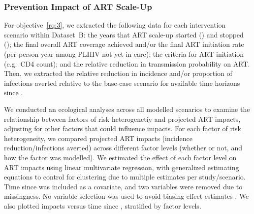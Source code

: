 \subsubsection{Prevention Impact of ART Scale-Up}
\label{sss:meth:api}
For objective~\ref{rq:3}, we extracted
the following data for each intervention scenario within Dataset~B:
the years that ART scale-up started () and stopped ();
the final overall ART coverage achieved and/or
the final ART initiation rate (per person-year among PLHIV not yet in care);
the criteria for ART initiation (e.g.\ CD4 count); and
the relative reduction in transmission probability on ART.
Then, we extracted the
relative reduction in incidence and/or proportion of infections averted
relative to the base-case scenario for available time horizons since .
\par
We conducted an ecological analyses across all modelled scenarios to examine the relationship between
factors of risk heterogenetiy and projected ART impacts,
adjusting for other factors that could influence impacts.
For each factor of risk heterogeneity, we compared
projected ART impacts (incidence reduction/infections averted)
across different factor levels (whether or not, and how the factor was modelled).
We estimated the effect of each factor level on ART impacts
using linear multivariate regression, with generalized estimating equations \cite{Hojsgaard2006}
to control for clustering due to multiple estimates per study/scenario.
Time since  was included as a covariate, and two variables were removed due to missingness.
No variable selection was used to avoid biasing effect estimates \cite{Harrell2001}.
We also plotted impacts versus time since , stratified by factor levels.